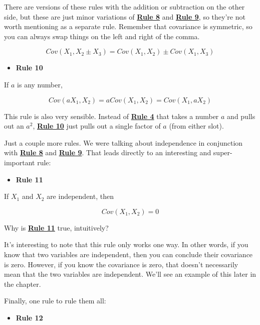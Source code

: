 \documentclass[
]{book}
\providecommand{\tightlist}{%
  \setlength{\itemsep}{0pt}\setlength{\parskip}{0pt}}
\begin{document}
There are versions of these rules with the addition or subtraction on the other side, but these are just minor variations of \protect\hyperlink{Rule8}{\textbf{Rule 8}} and \protect\hyperlink{Rule9}{\textbf{Rule 9}}, so they're not worth mentioning as a separate rule. Remember that covariance is symmetric, so you can always swap things on the left and right of the comma.

\[
Cov\left(X_{1}, X_{2} \pm X_{3}\right) = Cov\left(X_{1}, X_{2}\right) \pm Cov\left(X_{1}, X_{3}\right)  
\]

\begin{itemize}
\tightlist
\item
  \textbf{Rule 10}
\end{itemize}

If \(a\) is any number,

\[
Cov\left(a X_{1}, X_{2}\right) = a Cov\left(X_{1}, X_{2}\right) =  Cov\left(X_{1}, a X_{2}\right)  
\]

This rule is also very sensible. Instead of \href{./variance.html\#Rule4}{\textbf{Rule 4}} that takes a number \(a\) and pulls out an \(a^{2}\), \protect\hyperlink{Rule10}{\textbf{Rule 10}} just pulls out a single factor of \(a\) (from either slot).

Just a couple more rules. We were talking about independence in conjunction with \protect\hyperlink{Rule8}{\textbf{Rule 8}} and \protect\hyperlink{Rule9}{\textbf{Rule 9}}. That leads directly to an interesting and super-important rule:

\begin{itemize}
\tightlist
\item
  \textbf{Rule 11}
\end{itemize}

If \(X_{1}\) and \(X_{2}\) are independent, then

\[
Cov\left(X_{1}, X_{2}\right) = 0
\]

Why is \protect\hyperlink{Rule11}{\textbf{Rule 11}} true, intuitively?

It's interesting to note that this rule only works one way. In other words, if you know that two variables are independent, then you can conclude their covariance is zero. However, if you know the covariance is zero, that doesn't necessarily mean that the two variables are independent. We'll see an example of this later in the chapter.

Finally, one rule to rule them all:

\begin{itemize}
\tightlist
\item
  \textbf{Rule 12}
\end{itemize}
\end{document}
